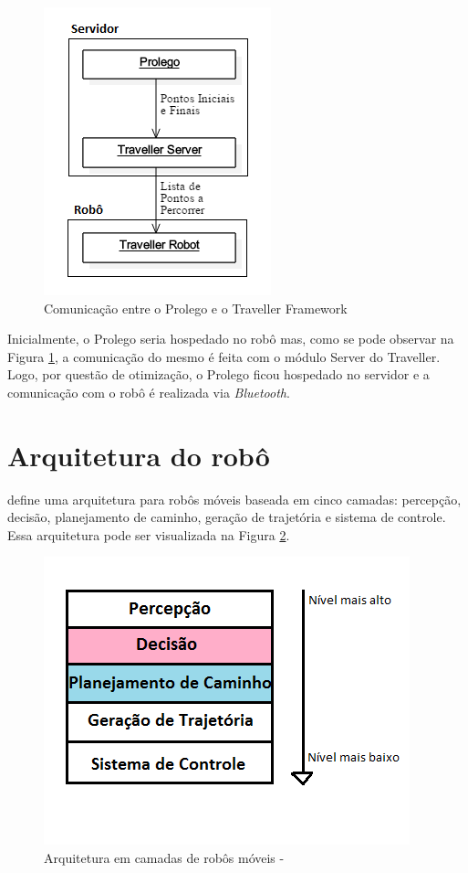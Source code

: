  \FloatBarrier
\begin{figure}[!h]
\centering
\includegraphics[keepaspectratio=true,scale=0.7]{figuras/Comunicacao_Prolego_Traveller.png}
\caption{Comunicação entre o Prolego e o Traveller Framework}
\label{ComunicacaoProlegoTraveller}
\end{figure}
 
 
 Inicialmente, o Prolego seria hospedado no robô mas, como se pode observar na Figura \ref{ComunicacaoProlegoTraveller}, a comunicação do mesmo é feita com o módulo Server do Traveller. Logo, por questão de otimização, o Prolego ficou hospedado no servidor e a comunicação com o robô é realizada via \textit{Bluetooth}.

\section{Arquitetura do robô}\label{arquiteturaDoRobo}
 define uma arquitetura para robôs móveis baseada em cinco camadas: percepção, decisão, planejamento de caminho, geração de trajetória e sistema de controle. Essa arquitetura pode ser visualizada na Figura \ref{arquiteturaCamadas}.

\FloatBarrier
\begin{figure}[!h]
\centering
\includegraphics[keepaspectratio=true,scale=0.7]{figuras/arquiteturaCamadas.png}
\caption{Arquitetura em camadas de robôs móveis - }
\label{arquiteturaCamadas}
\end{figure}

